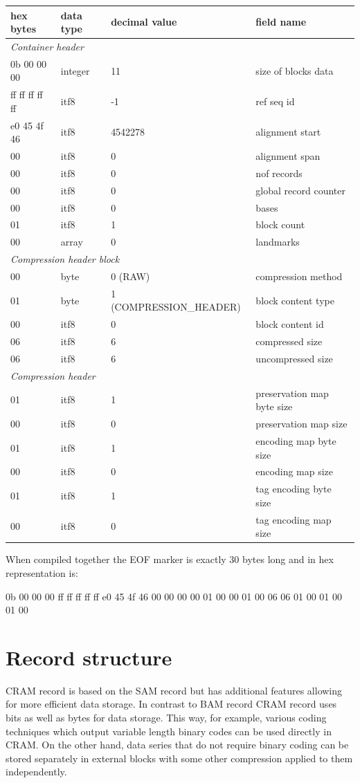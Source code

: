 \documentclass[a4paper]{article}
\begin{document}
\begin{tabular}{|l|l|>{\raggedright}p{150pt}|>{\raggedright}p{180pt}|}
\hline
\textbf{hex bytes} & \textbf{data type} & \textbf{decimal value} & \textbf{field 
name}\tabularnewline
\hline
\multicolumn{4}{|l|}{\textit{Container header}}\tabularnewline
\hline
0b 00 00 00 & integer & 11 & size of blocks data\tabularnewline
\hline
ff ff ff ff ff & itf8 & -1 & ref seq id\tabularnewline
\hline
e0 45 4f 46 & itf8 & 4542278 & alignment start\tabularnewline
\hline
00 & itf8 & 0 & alignment span\tabularnewline
\hline
00 & itf8 & 0 & nof records\tabularnewline
\hline
00 & itf8 & 0 & global record counter\tabularnewline
\hline
00 & itf8 & 0 & bases\tabularnewline
\hline
01 & itf8 & 1 & block count\tabularnewline
\hline
00 & array & 0 & landmarks\tabularnewline
\hline
\multicolumn{4}{|l|}{\textit{Compression header block}}\tabularnewline
\hline
00 & byte & 0 (RAW) & compression method\tabularnewline
\hline
01 & byte & 1 (COMPRESSION\_HEADER) & block content type\tabularnewline
\hline
00 & itf8 & 0 & block content id\tabularnewline
\hline
06 & itf8 & 6 & compressed size\tabularnewline
\hline
06 & itf8 & 6 & uncompressed size\tabularnewline
\hline
\multicolumn{4}{|l|}{\textit{Compression header}}\tabularnewline
\hline
01 & itf8 & 1 & preservation map byte size\tabularnewline
\hline
00 & itf8 & 0 & preservation map size\tabularnewline
\hline
01 & itf8 & 1 & encoding map byte size\tabularnewline
\hline
00 & itf8 & 0 & encoding map size\tabularnewline
\hline
01 & itf8 & 1 & tag encoding byte size\tabularnewline
\hline
00 & itf8 & 0 & tag encoding map size\tabularnewline
\hline
\end{tabular}

When compiled together the EOF marker is exactly 30 bytes long and in hex representation 
is:

0b 00 00 00 ff ff ff ff ff e0 45 4f 46 00 00 00 00 01 00  00 01 00 06 06 01 00 
01 00 01 00

\section{\textbf{Record structure}}

CRAM record is based on the SAM record but has additional features allowing for 
more efficient data storage.  In contrast to BAM record CRAM record uses bits as 
well as bytes for data storage. This way, for example, various coding techniques 
which output variable length binary codes can be used directly in CRAM. On the 
other hand, data series that do not require binary coding can be stored separately 
in external blocks with some other compression applied to them independently.
\end{document}
